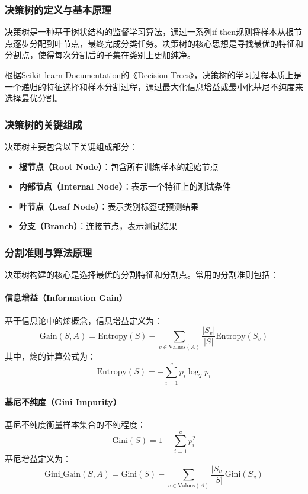 \documentclass[UTF8]{report}
\theoremstyle{MyLineTheoremStyle} %
\theoremstyle{MyBlockTheoremStyle} %
\theoremstyle{MySubsubsectionStyle} %
\begin{document}
\subsubsection{决策树的定义与基本原理}

决策树是一种基于树状结构的监督学习算法，通过一系列if-then规则将样本从根节点逐步分配到叶节点，最终完成分类任务。决策树的核心思想是寻找最优的特征和分割点，使得每次分割后的子集在类别上更加纯净。

根据Scikit-learn Documentation的《Decision Trees》，决策树的学习过程本质上是一个递归的特征选择和样本分割过程，通过最大化信息增益或最小化基尼不纯度来选择最优分割。

\subsubsection{决策树的关键组成}

决策树主要包含以下关键组成部分：

\begin{itemize}
    \item \textbf{根节点（Root Node）}：包含所有训练样本的起始节点
    \item \textbf{内部节点（Internal Node）}：表示一个特征上的测试条件
    \item \textbf{叶节点（Leaf Node）}：表示类别标签或预测结果
    \item \textbf{分支（Branch）}：连接节点，表示测试结果
\end{itemize}

\subsubsection{分割准则与算法原理}

决策树构建的核心是选择最优的分割特征和分割点。常用的分割准则包括：

\paragraph{信息增益（Information Gain）}
基于信息论中的熵概念，信息增益定义为：
\begin{equation}
\text{Gain}(S, A) = \text{Entropy}(S) - \sum_{v \in \text{Values}(A)} \frac{|S_v|}{|S|} \text{Entropy}(S_v)
\end{equation}
其中，熵的计算公式为：
\begin{equation}
\text{Entropy}(S) = -\sum_{i=1}^{c} p_i \log_2 p_i
\end{equation}

\paragraph{基尼不纯度（Gini Impurity）}
基尼不纯度衡量样本集合的不纯程度：
\begin{equation}
\text{Gini}(S) = 1 - \sum_{i=1}^{c} p_i^2
\end{equation}
基尼增益定义为：
\begin{equation}
\text{Gini\_Gain}(S, A) = \text{Gini}(S) - \sum_{v \in \text{Values}(A)} \frac{|S_v|}{|S|} \text{Gini}(S_v)
\end{equation}
\end{document}
